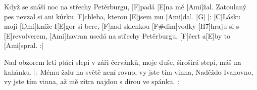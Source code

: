 
\sloka
[Ami]Když se snáší noc na střechy Petěrburgu, [F]padá [E]na mě [Ami]žal.
Zatoulaný pes nevzal si ani kůrku [F]chleba, kterou [E]jsem mu [Ami]dal. [G]
|: [C]Lásku moji [Dmi]kníže I[E]gor si bere,
[F]nad sklenkou [F#dim]vodky [H7]hraju si s [E]revolverem,
[Ami]havran usedá na střechy Petěrburgu, [F]čert a[E]by to [Ami]spral. :|

\sloka
Nad obzorem letí ptáci slepí v záři červánků,
moje duše, široširá stepi, máš na kahánku.
|: Mému žalu na světě není rovno,
vy jste tím vinna, Naděždo Ivanovno,
vy jste tím vinna, až mě zítra najdou s dírou ve spánku. :|
